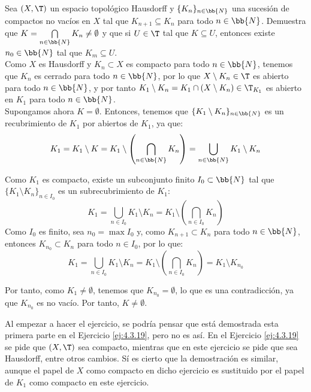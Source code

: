 \begin{ejercicio}
    Sea $(X, \T)$ un espacio topológico Hausdorff y $\{K_n\}_{n \in \bb{N}}$ una
    sucesión de compactos no vacíos en $X$ tal que $K_{n+1} \subseteq K_n$ para todo $n \in \bb{N}$.
    Demuestra que $K = \bigcap\limits_{n \in \bb{N}} K_n \neq \emptyset$
    y que si $U \in \T$ tal que $K \subseteq U$, entonces existe $n_0 \in \bb{N}$ tal que $K_m \subseteq U$.\\

    Como $X$ es Hausdorff y $K_n\subset X$ es compacto para todo $n\in \bb{N}$, 
    tenemos que $K_n$ es cerrado para todo $n\in \bb{N}$, por lo que $X\setminus K_n\in \T$ es abierto para todo $n\in \bb{N}$, y por tanto
    $K_1\setminus K_n = K_1 \cap (X\setminus K_n)\in \T_{K_1}$ es abierto en $K_1$ para todo $n\in \bb{N}$.\\
    
    Supongamos ahora $K=\emptyset$. Entonces, tenemos que $\{K_1\setminus K_n\}_{n\in \bb{N}}$
    es un recubrimiento de $K_1$ por abiertos de $K_1$, ya que: 
    \begin{equation*}
        K_1 = K_1\setminus K
        = K_1 \setminus \left(\bigcap_{n\in \bb{N}} K_n\right)
        = \bigcup_{n\in \bb{N}} K_1\setminus K_n
    \end{equation*}    
    
    Como $K_1$ es compacto, existe un subconjunto finito $I_0\subset \bb{N}$ tal que $\{K_1\setminus K_n\}_{n\in I_0}$ es un subrecubrimiento de $K_1$:
    \begin{equation*}
        K_1 = \bigcup_{n\in I_0} K_1\setminus K_n
        = K_1\setminus \left(\bigcap_{n\in I_0} K_n\right)
    \end{equation*}
    Como $I_0$ es finito, sea $n_0=\max I_0$ y, como $K_{n+1}\subset K_n$ para todo $n\in \bb{N}$, entonces
    $K_{n_0} \subset K_n$ para todo $n\in I_0$, por lo que:
    \begin{equation*}
        K_1 = \bigcup_{n\in I_0} K_1\setminus K_n
        = K_1 \setminus \left(\bigcap_{n\in I_0} K_n\right)
        = K_1 \setminus K_{n_0}
    \end{equation*}

    Por tanto, como $K_1\neq \emptyset$, tenemos que $K_{n_0}=\emptyset$, lo que es una contradicción, ya que $K_{n_0}$ es no vacío.
    Por tanto, $K\neq \emptyset$.

    \begin{observacion}
        Al empezar a hacer el ejercicio, se podría pensar que está demostrada esta primera parte en el Ejercicio \ref{ej:4.3.19}, pero no es así.
        En el Ejercicio \ref{ej:4.3.19} se pide que $(X,\T)$ sea compacto, mientras que en este ejercicio se pide que sea Hausdorff, entre otros cambios.
        Sí es cierto que la demostración es similar, aunque el papel de $X$ como compacto en dicho ejercicio es
        sustituido por el papel de $K_1$ como compacto en este ejercicio.
    \end{observacion}


\end{ejercicio}
